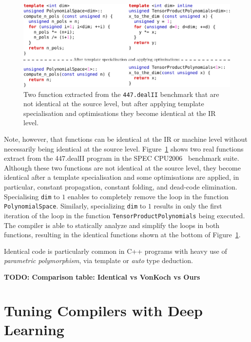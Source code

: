 \begin{figure}[h]
\centering
\includegraphics[scale=0.9]{src/relatedwork/figs/identical-example}
\caption{Two function extracted from the \texttt{447.dealII} benchmark that are not identical at the source level, but after applying template specialisation and optimisations they become identical at the IR level.}
\label{fig:identical-example}
\end{figure}

Note, however, that functions can be identical at the IR or machine level without necessarily being identical at the source level.
Figure~\ref{fig:identical-example} shows two real functions extract from the
447.dealII program in the SPEC CPU2006~\cite{spec} benchmark suite.
Although these two functions are not identical at the source level, they become
identical after a template specialisation and some optimisations are applied, in
particular, constant propagation, constant folding, and dead-code elimination. 
Specialising \verb|dim| to $1$ enables to completely remove the loop in the
function \verb|PolynomialSpace|.
Similarly, specializing \verb|dim| to $1$ results in only the first iteration
of the loop in the function \verb|TensorProductPolynomials| being executed.
The compiler is able to statically analyze and simplify the loops in both
functions, resulting in the identical functions shown at the bottom of
Figure~\ref{fig:identical-example}.

Identical code is particularly common in C++ programs
with heavy use of \textit{parametric polymorphism}, via template or \textit{auto} type deduction.







\textbf{TODO: Comparison table: Identical vs VonKoch vs Ours}





\section{Tuning Compilers with Deep Learning}

